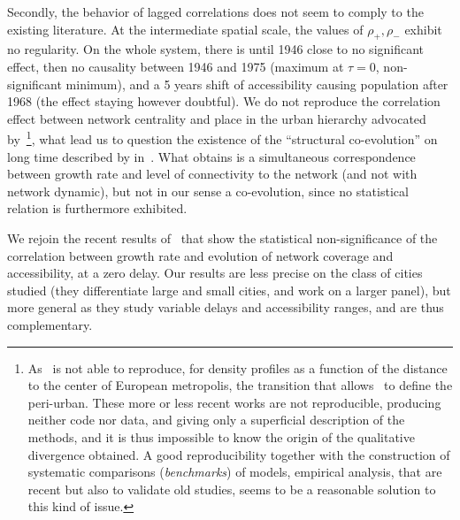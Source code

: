 Secondly, the behavior of lagged correlations does not seem to comply to the existing literature. At the intermediate spatial scale, the values of $\rho_+,\rho_-$ exhibit no regularity. On the whole system, there is until 1946 close to no significant effect, then no causality between 1946 and 1975 (maximum at $\tau = 0$, non-significant minimum), and a 5 years shift of accessibility causing population after 1968 (the effect staying however doubtful). We do not reproduce the correlation effect between network centrality and place in the urban hierarchy advocated by~\cite{bretagnolle2003vitesse}\footnote{As~\cite{lemoy2017scaling} is not able to reproduce, for density profiles as a function of the distance to the center of European metropolis, the transition that allows~\cite{guerois2008built} to define the peri-urban. These more or less recent works are not reproducible, producing neither code nor data, and giving only a superficial description of the methods, and it is thus impossible to know the origin of the qualitative divergence obtained. A good reproducibility together with the construction of systematic comparisons (\emph{benchmarks}) of models, empirical analysis, that are recent but also to validate old studies, seems to be a reasonable solution to this kind of issue.}, what lead us to question the existence of the ``structural co-evolution'' on long time described by  in~\cite{espacegeo2014effets}. What \cite{bretagnolle2003vitesse} obtains is a simultaneous correspondence between growth rate and level of connectivity to the network (and not with network dynamic), but not in our sense a co-evolution, since no statistical relation is furthermore exhibited.



We rejoin the recent results of~\cite{mimeur:hal-01616746} that show the statistical non-significance of the correlation between growth rate and evolution of network coverage and accessibility, at a zero delay. Our results are less precise on the class of cities studied (they differentiate large and small cities, and work on a larger panel), but more general as they study variable delays and accessibility ranges, and are thus complementary.


